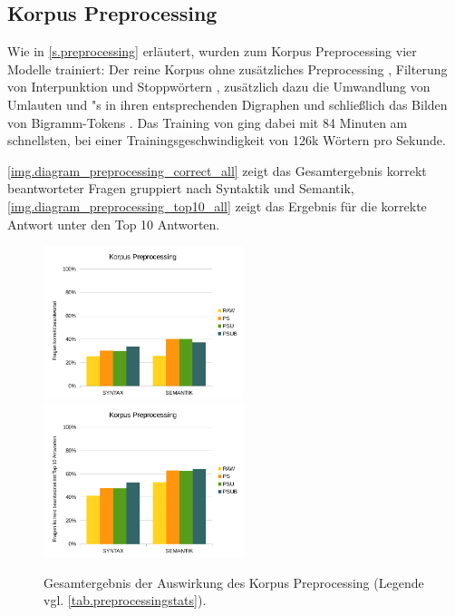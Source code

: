 \subsection{Korpus Preprocessing}
Wie in \autoref{s.preprocessing} erläutert, wurden zum Korpus Preprocessing vier Modelle trainiert: Der reine Korpus ohne zusätzliches Preprocessing , Filterung von Interpunktion und Stoppwörtern , zusätzlich dazu die Umwandlung von Umlauten und "s in ihren entsprechenden Digraphen  und schließlich das Bilden von Bigramm-Tokens . Das Training von  ging dabei mit 84 Minuten am schnellsten, bei einer Trainingsgeschwindigkeit von 126k Wörtern pro Sekunde.

\autoref{img.diagram_preprocessing_correct_all} zeigt das Gesamtergebnis korrekt beantworteter Fragen gruppiert nach Syntaktik und Semantik, \autoref{img.diagram_preprocessing_top10_all} zeigt das Ergebnis für die korrekte Antwort unter den Top 10 Antworten.

\begin{figure}[H]
\begin{adjustwidth}{-4mm}{-4mm}
\centering
{}
{\includegraphics[width=0.52\textwidth]{images/diagram_preprocessing_correct_all}}
{\includegraphics[width=0.52\textwidth]{images/diagram_preprocessing_top10_all}}
\caption[Gesamtergebnis Korpus Preprocessing]{Gesamtergebnis der Auswirkung des Korpus Preprocessing (Legende vgl. \autoref{tab.preprocessingstats}).}\label{img.diagram_preprocessing_all}
\end{adjustwidth}
\end{figure}

